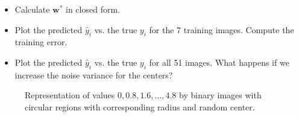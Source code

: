 \documentclass[a4]{article}
\begin{document}
\begin{itemize}
\item Calculate $\mathbf{w}^*$ in closed form.
\item Plot the predicted $\hat{y}_i$ vs. the true $y_i$ for the 7 training images. Compute the training error.
\item Plot the predicted $\hat{y}_i$ vs. the true $y_i$ for all 51 images. What happens if we increase the noise variance for the centers?
\end{itemize}

\begin{figure}[!h]
\begin{center}
\centering
\end{center}
\caption{\label{fig:circles}Representation of values $0, 0.8, 1.6,\dots, 4.8$ by binary images with circular regions with corresponding radius and random center.}
\end{figure}
\end{document}
